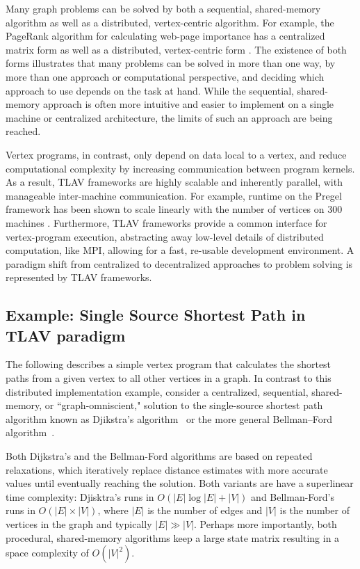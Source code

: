 \documentclass[reprint,twocolumn,showpacs,preprintnumbers,amsmath, aps,pre,amssymb]{revtex4-1}
\begin{document}
Many graph problems can be solved by both a sequential, shared-memory algorithm as well as a distributed, vertex-centric algorithm.  For example, the PageRank algorithm for calculating web-page importance has a centralized matrix form \cite{Page1999} as well as a distributed, vertex-centric form \cite{Malewicz2010}.  The existence of both forms illustrates that many problems can be solved in more than one way, by more than one approach or computational perspective, and deciding which approach to use depends on the task at hand.  While the sequential, shared-memory approach is often more intuitive and easier to implement on a single machine or centralized architecture, the limits of such an approach are being reached. 

Vertex programs, in contrast, only depend on data local to a vertex, and reduce computational complexity by increasing communication between program kernels.   As a result, TLAV frameworks are highly scalable and inherently parallel, with manageable inter-machine communication.  For example, runtime on the Pregel framework has been shown to scale linearly with the number of vertices on 300 machines \cite{Malewicz2010}.  Furthermore, TLAV frameworks provide a common interface for vertex-program execution, abstracting away low-level details of distributed computation, like MPI, allowing for a fast, re-usable development environment.  A paradigm shift from centralized to decentralized approaches to problem solving is represented by TLAV frameworks.

\subsection{Example: Single Source Shortest Path in TLAV paradigm}
\label{subsec:algo}

The following describes a simple vertex program that calculates the shortest paths from a given vertex to all other vertices in a graph. In contrast to this distributed implementation example, consider a centralized, sequential, shared-memory, or ``graph-omniscient," solution to the single-source shortest path algorithm known as Djikstra's algorithm~\cite{Dijkstra1959} or the more general Bellman–Ford algorithm~\cite{Bellman1958}.

Both Dijkstra's and the Bellman-Ford algorithms are based on repeated relaxations, which iteratively replace distance estimates with more accurate values until eventually reaching the solution. Both variants are have a superlinear time complexity: Djisktra's runs in $O(|E|\log|E|+|V|)$ and Bellman-Ford's runs in $O(|E|\times|V|)$, where $|E|$ is the number of edges and $|V|$ is the number of vertices in the graph and typically $|E|\gg|V|$. Perhaps more importantly, both procedural, shared-memory algorithms keep a large state matrix resulting in a space complexity of $O(|V|^2)$.
\end{document}
